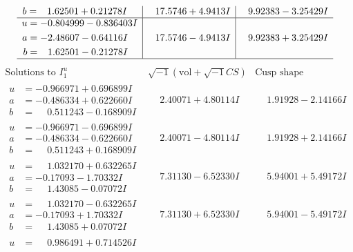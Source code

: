 \documentclass[1p]{elsarticle_modified}
\theoremstyle{definition}
\newcommand{\I}{\sqrt{-1}}
\begin{document}
$$\begin{array}{c|c|c}
\begin{aligned}
b &= \phantom{-}1.62501 + 0.21278 I\end{aligned}
 & \phantom{-}17.5746 + 4.9413 I & \phantom{-}9.92383 - 3.25429 I \\ \hline\begin{aligned}
u &= -0.804999 - 0.836403 I \\
a &= -2.48607 - 0.64116 I \\
b &= \phantom{-}1.62501 - 0.21278 I\end{aligned}
 & \phantom{-}17.5746 - 4.9413 I & \phantom{-}9.92383 + 3.25429 I\\
 \hline 
 \end{array}$$\newpage$$\begin{array}{c|c|c}  
\text{Solutions to }I^u_{1}& \I (\text{vol} + \sqrt{-1}CS) & \text{Cusp shape}\\
 \hline 
\begin{aligned}
u &= -0.966971 + 0.696899 I \\
a &= -0.486334 + 0.622660 I \\
b &= \phantom{-}0.511243 - 0.168909 I\end{aligned}
 & \phantom{-}2.40071 + 4.80114 I & \phantom{-}1.91928 - 2.14166 I \\ \hline\begin{aligned}
u &= -0.966971 - 0.696899 I \\
a &= -0.486334 - 0.622660 I \\
b &= \phantom{-}0.511243 + 0.168909 I\end{aligned}
 & \phantom{-}2.40071 - 4.80114 I & \phantom{-}1.91928 + 2.14166 I \\ \hline\begin{aligned}
u &= \phantom{-}1.032170 + 0.632265 I \\
a &= -0.17093 - 1.70332 I \\
b &= \phantom{-}1.43085 - 0.07072 I\end{aligned}
 & \phantom{-}7.31130 - 6.52330 I & \phantom{-}5.94001 + 5.49172 I \\ \hline\begin{aligned}
u &= \phantom{-}1.032170 - 0.632265 I \\
a &= -0.17093 + 1.70332 I \\
b &= \phantom{-}1.43085 + 0.07072 I\end{aligned}
 & \phantom{-}7.31130 + 6.52330 I & \phantom{-}5.94001 - 5.49172 I \\ \hline\begin{aligned}
u &= \phantom{-}0.986491 + 0.714526 I \\

\end{aligned}
\end{array}$$
\end{document}
